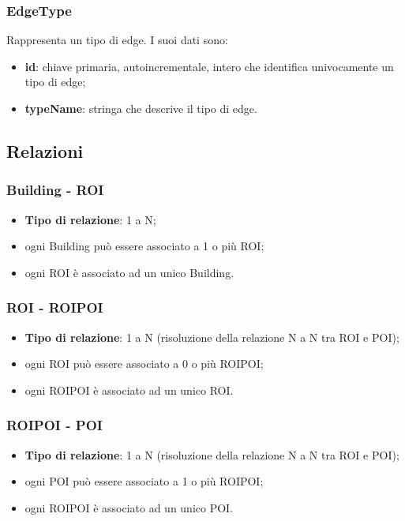 \documentclass[../SpecificaTecnica.tex]{subfiles}
\begin{document}
		\subsubsection{EdgeType}
			Rappresenta un tipo di edge. I suoi dati sono:
			\begin{itemize}
				\item \textbf{id}: chiave primaria, autoincrementale, intero che identifica univocamente un tipo di edge;
				\item \textbf{typeName}: stringa che descrive il tipo di edge.
			\end{itemize}
	\subsection{Relazioni}
		\subsubsection{Building - ROI}
			\begin{itemize}
				\item \textbf{Tipo di relazione}: 1 a N;
				\item ogni Building può essere associato a 1 o più ROI;
				\item ogni ROI è associato ad un unico Building.
			\end{itemize}
		\subsubsection{ROI - ROIPOI}
			\begin{itemize}
				\item \textbf{Tipo di relazione}: 1 a N (risoluzione della relazione N a N tra ROI e POI);
				\item ogni ROI può essere associato a 0 o più ROIPOI;
				\item ogni ROIPOI è associato ad un unico ROI.
			\end{itemize}
		\subsubsection{ROIPOI - POI}
			\begin{itemize}
				\item \textbf{Tipo di relazione}: 1 a N (risoluzione della relazione N a N tra ROI e POI);
				\item ogni POI può essere associato a 1 o più ROIPOI;
				\item ogni ROIPOI è associato ad un unico POI.
			\end{itemize}
\end{document}
